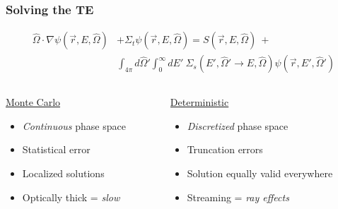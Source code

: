 \documentclass[xcolor=x11names,compress]{beamer}
\renewcommand{\(}{\begin{columns}}
\renewcommand{\)}{\end{columns}}
\newcommand{\<}[1]{\begin{column}{#1}}
\renewcommand{\>}{\end{column}}
\newcommand{\vOmega}{\ensuremath{\hat{\Omega}}}
\begin{document}
\begin{frame}[fragile]
  \frametitle{Solving the TE}
  \begin{align}
\vOmega \cdot \nabla \psi(\vec{r}, E, \vOmega) &+
\Sigma_t \psi(\vec{r}, E, \vOmega) = S(\vec{r}, E, \vOmega) \:+\nonumber\\
%
& \int_{4\pi} d\vOmega' \int_0^{\infty} dE'\: \Sigma_s(E', \vOmega' \rightarrow E, \vOmega) \psi(\vec{r}, E', \vOmega') \nonumber
\end{align}
%
\begin{columns}
  \begin{column}{0.5\textwidth}
  \begin{center}
  \underline{Monte Carlo}
  \end{center}
  \vspace*{-1em}
	\begin{itemize}
	\item \textit{Continuous} phase space%
	\item Statistical error
	\item Localized solutions
	\item Optically thick = \textit{slow}
	\end{itemize}
  \end{column}
  \begin{column}{0.5\textwidth}
  \begin{center}
  \underline{Deterministic}
  \end{center}
  \vspace*{-1em}
	\begin{itemize}
	\item \textit{Discretized} phase space%
	\item Truncation errors
	\item Solution equally valid everywhere
	\item Streaming = \textit{ray effects}
	\end{itemize}
  \end{column}
\end{columns}

\end{frame}
\end{document}
